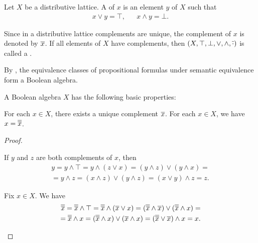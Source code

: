 \begin{definition}\label{def:boolean_algebra}\cite{nLab:boolean_algebra}
  Let \( X \) be a distributive lattice. A  of \( x \) is an element \( y \) of \( X \) such that
  \begin{align*}
    x \vee y = \top, && x \wedge y = \bot.
  \end{align*}

  Since in a distributive lattice complements are unique, the complement of \( x \) is denoted by \( \overline{x} \). If all elements of \( X \) have complements, then \( (X, \top, \bot, \vee, \wedge, \overline{\cdot}) \) is called a .
\end{definition}

\begin{example}\label{ex:boolean_algebra}
  By , the equivalence classes of propositional formulas under semantic equivalence form a Boolean algebra.
\end{example}

\begin{proposition}\label{thm:boolean_algebra_properties}
  A Boolean algebra \( X \) has the following basic properties:
  \begin{propenum}
     For each \( x \in X \), there exists a unique complement \( \overline{x} \).
     For each \( x \in X \), we have \( x = \overline{\overline{x}} \).
  \end{propenum}
\end{proposition}
\begin{proof}\mbox{}
  \begin{itemize}
     If \( y \) and \( z \) are both complements of \( x \), then
    \begin{align*}
      y
      =
      y \wedge \top
      =
      y \wedge (z \vee x)
      =
      (y \wedge z) \vee (y \wedge x)
      = \\ =
      y \wedge z
      =
      (x \wedge z) \vee (y \wedge z)
      =
      (x \vee y) \wedge z
      =
      z.
    \end{align*}

     Fix \( x \in X \). We have
    \begin{align*}
      \overline{\overline{x}}
      =
      \overline{\overline{x}} \wedge \top
      =
      \overline{\overline{x}} \wedge (\overline{x} \vee x)
      =
      (\overline{\overline{x}} \wedge \overline{x}) \vee (\overline{\overline{x}} \wedge x)
      = \\ =
      \overline{\overline{x}} \wedge x
      =
      (\overline{\overline{x}} \wedge x) \vee (\overline{x} \wedge x)
      =
      (\overline{\overline{x}} \vee \overline{x}) \wedge x
      =
      x.
    \end{align*}
  \end{itemize}
\end{proof}

